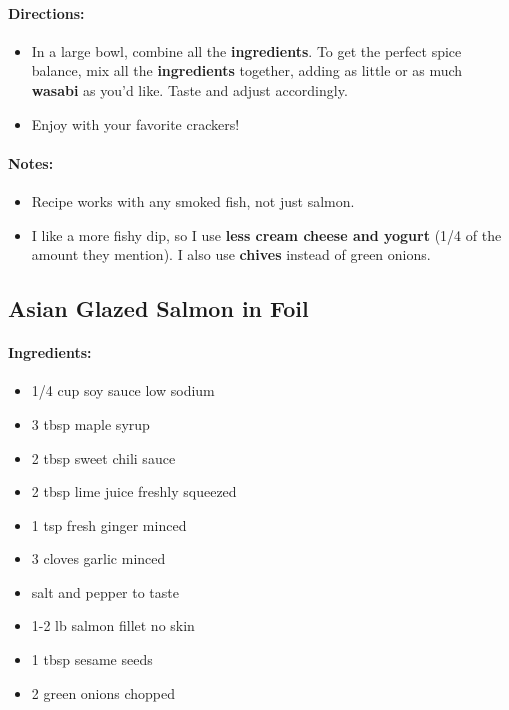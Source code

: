 \documentclass{article}
\begin{document}
\paragraph{Directions:}
\begin{itemize}
    \item In a large bowl, combine all the \textbf{ingredients}. To get the perfect spice balance, mix all the \textbf{ingredients} together, adding as little or as much \textbf{wasabi} as you'd like. Taste and adjust accordingly.
    \item Enjoy with your favorite crackers!
\end{itemize}

\paragraph{Notes:}
\begin{itemize}
    \item Recipe works with any smoked fish, not just salmon.
    \item I like a more fishy dip, so I use \textbf{less cream cheese and yogurt} (1/4 of the amount they mention). I also use \textbf{chives} instead of green onions.
\end{itemize}

\subsection{Asian Glazed Salmon in Foil}

\paragraph{Ingredients:}
\begin{itemize}
    \item 1/4 cup soy sauce low sodium
    \item 3 tbsp maple syrup
    \item 2 tbsp sweet chili sauce
    \item 2 tbsp lime juice freshly squeezed
    \item 1 tsp fresh ginger minced
    \item 3 cloves garlic minced
    \item salt and pepper to taste
    \item 1-2 lb salmon fillet no skin
    \item 1 tbsp sesame seeds
    \item 2 green onions chopped
\end{itemize}
\end{document}
